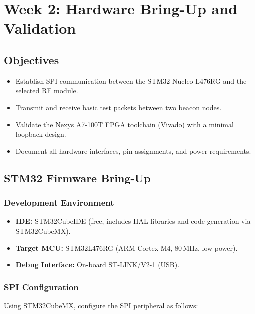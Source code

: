 \documentclass[11pt,letterpaper]{article}
\begin{document}
	\newpage
	\section{Week 2: Hardware Bring-Up and Validation}
	\label{sec:bringup}
	
	\subsection{Objectives}
	
	\begin{itemize}[leftmargin=2em]
		\item Establish SPI communication between the STM32 Nucleo-L476RG and the selected RF module.
		\item Transmit and receive basic test packets between two beacon nodes.
		\item Validate the Nexys A7-100T FPGA toolchain (Vivado) with a minimal loopback design.
		\item Document all hardware interfaces, pin assignments, and power requirements.
	\end{itemize}
	
	\subsection{STM32 Firmware Bring-Up}
	
	\subsubsection{Development Environment}
	
	\begin{itemize}[leftmargin=2em]
		\item \textbf{IDE:} STM32CubeIDE (free, includes HAL libraries and code generation via STM32CubeMX).
		\item \textbf{Target MCU:} STM32L476RG (ARM Cortex-M4, 80\,MHz, low-power).
		\item \textbf{Debug Interface:} On-board ST-LINK/V2-1 (USB).
	\end{itemize}
	
	\subsubsection{SPI Configuration}
	
	Using STM32CubeMX, configure the SPI peripheral as follows:
	
\end{document}

